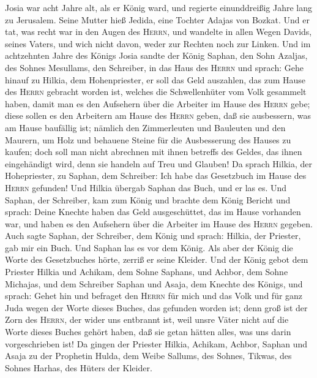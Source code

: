  Josia war acht Jahre alt, als er König ward, und regierte
einunddreißig Jahre lang zu Jerusalem. Seine Mutter hieß Jedida, eine
Tochter Adajas von Bozkat.  Und er tat, was recht war in
den Augen des \textsc{Herrn}, und wandelte in allen Wegen Davids, seines
Vaters, und wich nicht davon, weder zur Rechten noch zur Linken.
 Und im achtzehnten Jahre des Königs Josia sandte der
König Saphan, den Sohn Azaljas, des Sohnes Mesullams, den Schreiber, in
das Haus des \textsc{Herrn} und sprach:  Gehe hinauf zu
Hilkia, dem Hohenpriester, er soll das Geld auszahlen, das zum Hause des
\textsc{Herrn} gebracht worden ist, welches die Schwellenhüter vom Volk
gesammelt haben,  damit man es den Aufsehern über die
Arbeiter im Hause des \textsc{Herrn} gebe; diese sollen es den Arbeitern
am Hause des \textsc{Herrn} geben, daß sie ausbessern, was am Hause
baufällig ist;  nämlich den Zimmerleuten und Bauleuten und
den Maurern, um Holz und behauene Steine für die Ausbesserung des Hauses
zu kaufen;  doch soll man nicht abrechnen mit ihnen
betreffs des Geldes, das ihnen eingehändigt wird, denn sie handeln auf
Treu und Glauben!  Da sprach Hilkia, der Hohepriester, zu
Saphan, dem Schreiber: Ich habe das Gesetzbuch im Hause des
\textsc{Herrn} gefunden! Und Hilkia übergab Saphan das Buch, und er las
es.  Und Saphan, der Schreiber, kam zum König und brachte
dem König Bericht und sprach: Deine Knechte haben das Geld
ausgeschüttet, das im Hause vorhanden war, und haben es den Aufsehern
über die Arbeiter im Hause des \textsc{Herrn} gegeben. 
Auch sagte Saphan, der Schreiber, dem König und sprach: Hilkia, der
Priester, gab mir ein Buch. Und Saphan las es vor dem König.
 Als aber der König die Worte des Gesetzbuches hörte,
zerriß er seine Kleider.  Und der König gebot dem
Priester Hilkia und Achikam, dem Sohne Saphans, und Achbor, dem Sohne
Michajas, und dem Schreiber Saphan und Asaja, dem Knechte des Königs,
und sprach:  Gehet hin und befraget den \textsc{Herrn}
für mich und das Volk und für ganz Juda wegen der Worte dieses Buches,
das gefunden worden ist; denn groß ist der Zorn des \textsc{Herrn}, der
wider uns entbrannt ist, weil unsre Väter nicht auf die Worte dieses
Buches gehört haben, daß sie getan hätten alles, was uns darin
vorgeschrieben ist!  Da gingen der Priester Hilkia,
Achikam, Achbor, Saphan und Asaja zu der Prophetin Hulda, dem Weibe
Sallums, des Sohnes, Tikwas, des Sohnes Harhas, des Hüters der Kleider.

